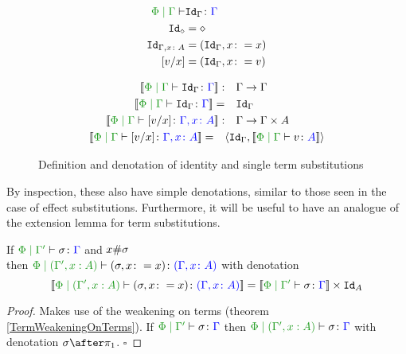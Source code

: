 \documentclass{Report}
\begin{document}
\begin{figure}[H]
    \centering

    \begin{minipage}{.45\linewidth}
        \begin{framed}
            \begin{align*}
                \etyperelation{\P}{\G}{&\Id{\G}}{\G}\\
                \Id{\nil} & = \nil\\
                \Id{\gax} & = (\idg, x\setto x)\\
                \ssub{x}{v} & = (\idg, x\setto v)
            \end{align*}
        \end{framed}
    \end{minipage}
    \quad
    \begin{minipage}{.45\linewidth}
        \begin{framed}
            \begin{align*}
                \deno{\etyperelation{\P}{\G}{\Id{\G}}{\G}}: &\quad \G\rightarrow\G\\
                \deno{\etyperelation{\P}{\G}{\Id{\G}}{\G}} = &\quad  \idg\\
                \deno{\etyperelation{\P}{\G}{\ssub{x}{v}}{\gax}}: &\quad \G\rightarrow \G\times A\\
                \deno{\etyperelation{\P}{\G}{\ssub{x}{v}}{\gax}} =\quad & \pr{\idg}{\deno{\gpetyperelation{v}{A}}}
            \end{align*}
        \end{framed}
    \end{minipage}
    
    \caption{Definition and denotation of identity and single term substitutions}
    \label{TermSubstitutionIdAndSingle}
\end{figure}



By inspection, these also have simple denotations, similar to those seen in the case of effect substitutions. Furthermore, it will be useful to have an analogue of the extension lemma for term substitutions.


\begin{framed}
    \begin{lemma}
        If $\etyperelation{\P}{\G'}{\si}{\G}$ and $x\#\sigma$\\ then $\etyperelation{\P}{(\G',x: A)}{(\si, x\setto x)}{(\gax)}$ with denotation $$\deno{\etyperelation{\P}{(\G',x: A)}{(\si, x\setto x)}{(\gax)}} = \deno{\etyperelation{\P}{\G'}{\si}{\G}} \times \Id{A}$$
    \end{lemma}
    
    \begin{proof}
         Makes use of the weakening on terms (theorem \ref{TermWeakeningOnTerms}). If $\etyperelation{\P}{\G'}{\si}{\G}$ then $\etyperelation{\P}{(\G', x:A) }{\si}{\G}$ with denotation $\si\after\p$. $\square$
    \end{proof}
\end{framed}
\end{document}
